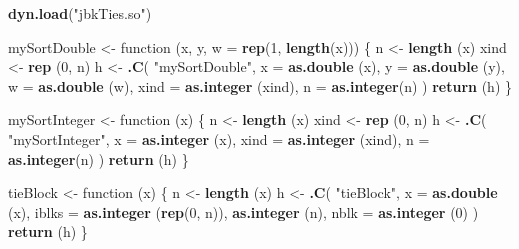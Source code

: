 \documentclass[12pt,]{article}
\newenvironment{Shaded}{\begin{snugshade}}{\end{snugshade}}
\newcommand{\KeywordTok}[1]{\textcolor[rgb]{0.13,0.29,0.53}{\textbf{{#1}}}}
\newcommand{\DataTypeTok}[1]{\textcolor[rgb]{0.13,0.29,0.53}{{#1}}}
\newcommand{\DecValTok}[1]{\textcolor[rgb]{0.00,0.00,0.81}{{#1}}}
\newcommand{\StringTok}[1]{\textcolor[rgb]{0.31,0.60,0.02}{{#1}}}
\newcommand{\NormalTok}[1]{{#1}}
\begin{document}
\begin{Shaded}
\begin{Highlighting}[]
\KeywordTok{dyn.load}\NormalTok{(}\StringTok{"jbkTies.so"}\NormalTok{)}

\NormalTok{mySortDouble <-}\StringTok{ }\NormalTok{function (x, y, }\DataTypeTok{w =} \KeywordTok{rep}\NormalTok{(}\DecValTok{1}\NormalTok{, }\KeywordTok{length}\NormalTok{(x))) \{}
  \NormalTok{n <-}\StringTok{ }\KeywordTok{length} \NormalTok{(x)}
  \NormalTok{xind <-}\StringTok{ }\KeywordTok{rep} \NormalTok{(}\DecValTok{0}\NormalTok{, n)}
  \NormalTok{h <-}
\StringTok{    }\KeywordTok{.C}\NormalTok{(}
      \StringTok{"mySortDouble"}\NormalTok{,}
      \DataTypeTok{x =} \KeywordTok{as.double} \NormalTok{(x),}
      \DataTypeTok{y =} \KeywordTok{as.double} \NormalTok{(y),}
      \DataTypeTok{w =} \KeywordTok{as.double} \NormalTok{(w),}
      \DataTypeTok{xind =} \KeywordTok{as.integer} \NormalTok{(xind),}
      \DataTypeTok{n =} \KeywordTok{as.integer}\NormalTok{(n)}
    \NormalTok{)}
  \KeywordTok{return} \NormalTok{(h)}
\NormalTok{\}}

\NormalTok{mySortInteger <-}\StringTok{ }\NormalTok{function (x) \{}
  \NormalTok{n <-}\StringTok{ }\KeywordTok{length} \NormalTok{(x)}
  \NormalTok{xind <-}\StringTok{ }\KeywordTok{rep} \NormalTok{(}\DecValTok{0}\NormalTok{, n)}
  \NormalTok{h <-}
\StringTok{    }\KeywordTok{.C}\NormalTok{(}
      \StringTok{"mySortInteger"}\NormalTok{,}
      \DataTypeTok{x =} \KeywordTok{as.integer} \NormalTok{(x),}
      \DataTypeTok{xind =} \KeywordTok{as.integer} \NormalTok{(xind),}
      \DataTypeTok{n =} \KeywordTok{as.integer}\NormalTok{(n)}
    \NormalTok{)}
  \KeywordTok{return} \NormalTok{(h)}
\NormalTok{\}}

\NormalTok{tieBlock <-}\StringTok{ }\NormalTok{function (x) \{}
  \NormalTok{n <-}\StringTok{ }\KeywordTok{length} \NormalTok{(x)}
  \NormalTok{h <-}
\StringTok{    }\KeywordTok{.C}\NormalTok{(}
      \StringTok{"tieBlock"}\NormalTok{,}
      \DataTypeTok{x =} \KeywordTok{as.double} \NormalTok{(x),}
      \DataTypeTok{iblks =} \KeywordTok{as.integer} \NormalTok{(}\KeywordTok{rep}\NormalTok{(}\DecValTok{0}\NormalTok{, n)),}
      \KeywordTok{as.integer} \NormalTok{(n),}
      \DataTypeTok{nblk =} \KeywordTok{as.integer} \NormalTok{(}\DecValTok{0}\NormalTok{)}
    \NormalTok{)}
  \KeywordTok{return} \NormalTok{(h)}
\NormalTok{\}}


\end{Highlighting}
\end{Shaded}
\end{document}
